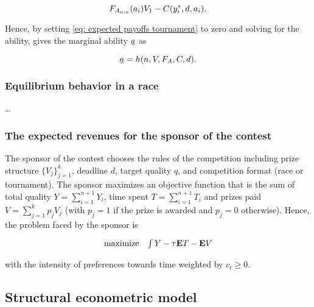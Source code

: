 \begin{equation}
  \label{eq: expected payoffs tournament}
  \pord[A]{n}(a_i) V_1  - C(y_i^*, d, a_i).
\end{equation}

Hence, by setting \eqref{eq: expected payoffs tournament} to zero and
solving for the ability, gives the marginal ability \(\underline a\) as

\begin{equation}
  \underline a = h(n, V, F_A, C, d). 
\end{equation}

\subsubsection{Equilibrium behavior in a
race}\label{equilibrium-behavior-in-a-race}

\ldots{}

\subsubsection{The expected revenues for the sponsor of the
contest}\label{the-expected-revenues-for-the-sponsor-of-the-contest}

The sponsor of the contest chooses the rules of the competition
including prize structure \(\{V_j\}_{j=1}^k\), deadline \(d\), target
quality \(q\), and competition format (race or tournament). The sponsor
maximizes an objective function that is the sum of total quality
\(Y=\sum_{i=1}^{n+1} Y_i\), time spent \(T=\sum_{i=1}^{n+1} T_i\) and
prizes paid \(V=\sum_{j=1}^k p_{j} V_j\) (with \(p_j=1\) if the prize is
awarded and \(p_j=0\) otherwise). Hence, the problem faced by the
sponsor is

\begin{equation}
  \begin{array}{ll}
    \mbox{maximize} & \int {Y}   -  \tau {\bf E}{T} - {\bf E}{V}
  \end{array}
\end{equation}

with the intensity of preferences towards time weighted by
\(c_t\geq 0\).

\subsection{Structural econometric
model}\label{structural-econometric-model}
